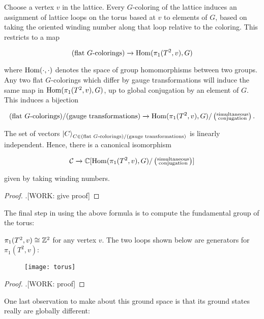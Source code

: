 \begin{proposition} Choose a vertex $v$ in the lattice. Every $G$-coloring of the lattice induces an assignment of lattice loops on the torus based at $v$ to elements of $G$, based on taking the oriented winding number along that loop relative to the coloring. This restricts to a map

$$(\text{flat $G$-colorings})\xrightarrow{}\operatorname{Hom}(\pi_1(T^2,v), G)$$

where $\operatorname{Hom}(\cdot,\cdot)$ denotes the space of group homomorphisms between two groups. Any two flat $G$-colorings which differ by gauge transformations will induce the same map in $\operatorname{Hom}(\pi_1(T^2,v), G)$, up to global conjugation by an element of $G$. This induces a bijection

$$(\text{flat $G$-colorings})/(\text{gauge transformations})\xrightarrow{}\operatorname{Hom}(\pi_1(T^2,v), G)/\left(\substack{\text{simultaneous} \\ \text{conjugation}}\right).$$

The set of vectors ${\ket{C}}_{C\in (\text{flat $G$-colorings})/(\text{gauge transformations})}$ is linearly independent. Hence, there is a canonical isomorphism

$$\mathcal{C} \xrightarrow{}\mathbb{C}[\operatorname{Hom}(\pi_1(T^2,v), G)/\left(\substack{\text{simultaneous} \\ \text{conjugation}}\right)]$$

given by taking winding numbers.
\end{proposition}
\begin{proof}.[WORK: give proof]
\end{proof}

The final step in using the above formula is to compute the fundamental group of the torus:

\begin{proposition} $\pi_1(T^2,v)\cong \mathbb{Z}^2$ for any vertex $v$. The two loops shown below are generators for $\pi_1(T^2,v)$:

\begin{figure}[h]
\begin{center}
\texttt{[image: torus]}
\end{center}
\end{figure}

\end{proposition}
\begin{proof}.[WORK: proof]
\end{proof}

One last observation to make about this ground space is that its ground states really are globally different:

